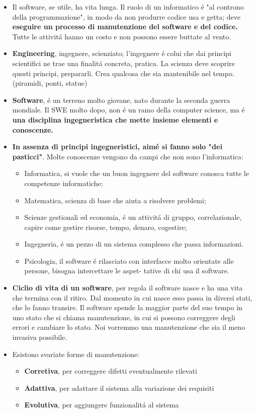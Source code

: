 \documentclass[10pt]{article}
\begin{document}
\begin{itemize}
\item Il software, se utile, ha vita lunga. Il ruolo di un informatico \'e "al
controno della programmazione", in modo da non produrre codice usa e getta; deve
\textbf{eseguire un processo di manutenzione del software e del codice.} Tutte le
attivit\'a hanno un costo e non possono essere buttate al vento.

\item \textbf{Engineering}, ingegnere, scienziato; l'ingegnere \'e colui che dai
principi scientifici ne trae una finalit\'a concreta, pratica. La scienza deve
scoprire questi principi, prepararli. Crea qualcosa che sia mantenibile nel tempo.
(piramidi, ponti, statue)
\item \textbf{Software}, \'e un terreno molto giovane, nato durante la seconda
guerra mondiale. Il SWE molto dopo, non \'e un ramo della computer science, ma
\'e \textbf{una disciplina ingegneristica che mette insieme elementi e
conoscenze.}
\item \textbf{In assenza di principi ingegneristici, aim\'e si fanno solo "dei
pasticci"}. Molte conoscenze vengono da campi che non sono l'informatica:
		\begin{itemize}
\item Informatica, si vuole che un buon ingegnere del software conosca tutte le
competenze informatiche;
		\item Matematica, scienza di base che aiuta a risolvere problemi;
\item Scienze gestionali ed economia, \'e un attivit\'a di gruppo, correlazionale,
capire come gestire risorse,
		tempo, denaro, cogestire;
		\item Ingegneria, \'e un pezzo di un sistema complesso che passa informazioni.
\item Psicologia, il software \'e rilasciato con interfacce molto orientate alle
persone, bisogna intercettare le aspet-
		tative di chi usa il software.
		\end{itemize}

\item \textbf{Ciclio di vita di un software}, per regola il software nasce e ha
una vita che termina con il ritiro. Dal momento
in cui nasce esso passa in diversi stati, che lo fanno transire. Il software
spende la maggior parte del suo tempo
in uno stato che si chiama manutenzione, in cui si possono correggere degli errori
e cambiare lo stato. Noi
vorremmo una manutenzione che sia il meno invasiva possibile.
	\item Esistono svariate forme di manutenzione:
	\begin{itemize}
		\item \textbf{Corretiva}, per correggere difetti eventualmente rilevati
		\item \textbf{Adattiva}, per adattare il sistema alla variazione dei requisiti
		\item \textbf{Evolutiva}, per aggiungere funzionalit\'a al sistema	


\end{itemize}
\end{itemize}
\end{document}
